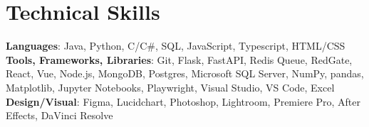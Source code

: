\documentclass[letterpaper,11pt]{article}
\begin{document}
\section{Technical Skills}
 \begin{itemize}[leftmargin=0.15in, label={}]
    \small{\item{
     \textbf{Languages}{: Java, Python, C/C\#, SQL, JavaScript, Typescript, HTML/CSS} \\
     \textbf{Tools, Frameworks, Libraries}{: Git, Flask, FastAPI, Redis Queue, RedGate, React, Vue, Node.js, MongoDB, Postgres, Microsoft SQL Server, NumPy, pandas, Matplotlib, Jupyter Notebooks, Playwright, Visual Studio, VS Code, Excel} \\
     \textbf{Design/Visual}{: Figma, Lucidchart, Photoshop, Lightroom, Premiere Pro, After Effects, DaVinci Resolve}
    }}
 \end{itemize}


  
\end{document}
